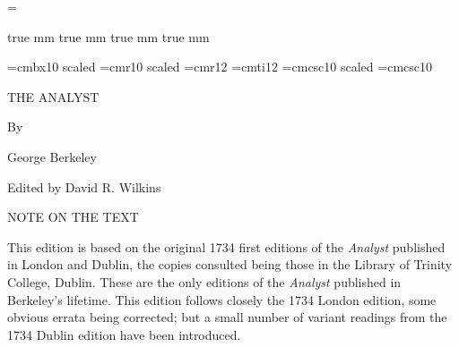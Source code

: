 %

\magnification=


 true mm  true mm
    true mm  true mm

\def\folio{\ifnum\pageno>0 \number\pageno \else
   \ifnum\pageno<0 \romannumeral-\pageno \else\fi\fi}

\font\Largebf=cmbx10  scaled 
\font\Largerm=cmr10   scaled 
\font\largerm=cmr12
\font\largeit=cmti12
\font\largesc=cmcsc10  scaled 
\font\sc=cmcsc10

\def\overcomma{\mathaccent"7027}
\def\doubleacute{\mathaccent"707D}

\long{}


\null\vskip72pt

\centerline{\Largebf THE ANALYST}

\vskip24pt

\centerline{\Largebf By}

\vskip24pt

\centerline{\Largebf George Berkeley}

\vfill

\centerline{\largerm Edited by David R. Wilkins}

\vskip 12pt

\centerline{}

\vskip36pt\eject


\null

\vfill\eject


\null\vskip36pt

\centerline{\Largebf NOTE ON THE TEXT}

\bigskip

This edition is based on the original 1734 first editions
of the {\it Analyst\/} published in London and Dublin,
the copies consulted being those in the Library of
Trinity College, Dublin.  These are the only editions
of the {\it Analyst\/} published in Berkeley's lifetime.
This edition follows closely the 1734 London edition,
some obvious errata being corrected; but a small number
of variant readings from the 1734 Dublin edition have been
introduced.

